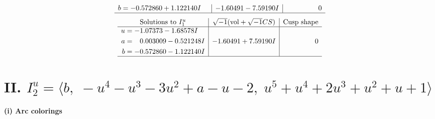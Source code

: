\documentclass[1p]{elsarticle_modified}
\theoremstyle{definition}
\newcommand{\I}{\sqrt{-1}}
\begin{document}
$$\begin{array}{c|c|c}
\begin{aligned}
b &= -0.572860 + 1.122140 I\end{aligned}
 & -1.60491 - 7.59190 I & \phantom{-0.000000 } 0\\
 \hline 
 \end{array}$$\newpage$$\begin{array}{c|c|c}  
\text{Solutions to }I^u_{1}& \I (\text{vol} + \sqrt{-1}CS) & \text{Cusp shape}\\
 \hline 
\begin{aligned}
u &= -1.07373 - 1.68578 I \\
a &= \phantom{-}0.003009 - 0.521248 I \\
b &= -0.572860 - 1.122140 I\end{aligned}
 & -1.60491 + 7.59190 I & \phantom{-0.000000 } 0\\
 \hline 
 \end{array}$$\newpage\newpage\renewcommand{\arraystretch}{1}
\centering \section*{II. $I^u_{2}= \langle b,\;- u^4- u^3-3 u^2+a- u-2,\;u^5+u^4+2 u^3+u^2+u+1 \rangle$}
\flushleft \textbf{(i) Arc colorings}\\
\end{document}

